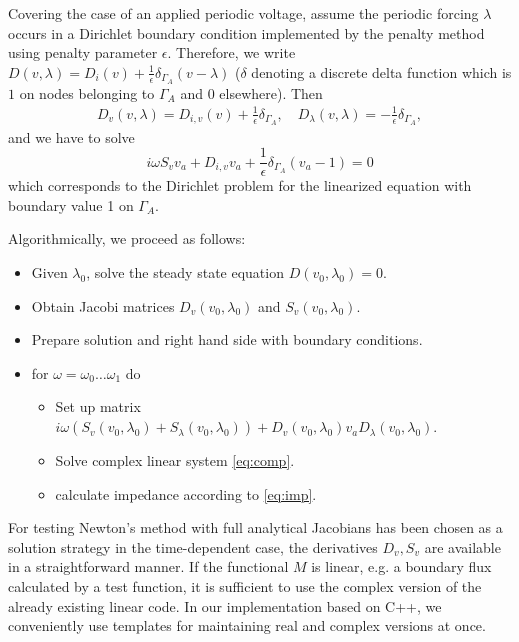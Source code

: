 \documentclass[english,nofirstpagebreak,empty]{amsproc}
\begin{document}
Covering the case of an  applied periodic voltage, assume the periodic
forcing  $\lambda$   occurs  in  a   Dirichlet  boundary  condition
implemented by the penalty  method using penalty parameter $\epsilon$.
Therefore,        we         write        $D(v,\lambda)=        D_i(v)
+\frac1\epsilon\delta_{\Gamma_A}(v-\lambda)$ ($\delta$ denoting
a discrete delta function which is $1$ on nodes belonging to $\Gamma_A$
and 0 elsewhere).  Then
\begin{equation*}
  \begin{split}
    D_v(v,\lambda)= D_{i,v}(v)+  \frac1\epsilon\delta_{\Gamma_A},\quad
    D_\lambda(v,\lambda)= -\frac1\epsilon\delta_{\Gamma_A},
   \end{split}
\end{equation*}
and we have to solve 
\begin{equation*}
  i\omega S_v v_a + D_{i,v} v_a  +\frac1\epsilon\delta_{\Gamma_A}(v_a-1) =0
\end{equation*} 
 which corresponds  to the  Dirichlet problem  for the
linearized equation  with boundary value 1 on  $\Gamma_A$.

Algorithmically, we proceed as follows:
\begin{itemize}
\item   Given $\lambda_0$, solve the steady state equation $D(v_0,\lambda_0)=0$.
\item Obtain Jacobi matrices $D_v(v_0,\lambda_0)$ and $S_v(v_0,\lambda_0)$. %
\item Prepare solution and right hand side with boundary conditions.
\item for $\omega=\omega_0\dots\omega_1$ do
  \begin{itemize}
  \item Set up matrix $i\omega\left( 
      S_v(v_0,\lambda_0)+S_\lambda(v_0,\lambda_0)\right)+ 
    D_v(v_0,\lambda_0)v_a
    D_\lambda(v_0,\lambda_0)$.
\item Solve complex linear system \eqref{eq:comp}.
\item calculate impedance according to \eqref{eq:imp}.
  \end{itemize}
\end{itemize}



For testing  Newton's method with  full analytical Jacobians  has been
chosen  as  a  solution  strategy  in  the  time-dependent  case,  the
derivatives $D_v, S_v$ are  available in a straightforward manner.  If
the functional  $M$ is linear, e.g.   a boundary flux  calculated by a
test  function, it is  sufficient to  use the  complex version  of the
already existing linear code.  In our implementation based on C++, we
conveniently use templates for  maintaining real and complex versions
at once.
\end{document}
